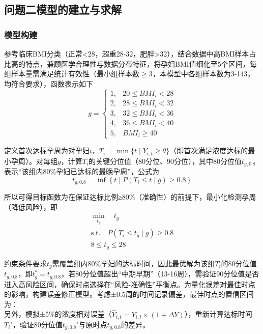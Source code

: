 \documentclass[withoutpreface,bwprint]{cumcmthesis} %
\begin{document}

\subsection{问题二模型的建立与求解}

\subsubsection{模型构建} 
参考临床BMI分类（正常<28，超重28-32，肥胖>32），结合数据中高BMI样本占比高的特点，兼顾医学合理性与数据分布特征，将孕妇BMI值细化至5个区间，每组样本量需满足统计有效性（最小组样本数$\ge$3，本模型中各组样本数为3-143，均符合要求），函数表示如下
\begin{equation}
    g = \begin{cases} 
1, & 20 \leq BMI_i < 28 \\
2, & 28 \leq BMI_i < 32 \\
3, & 32 \leq BMI_i < 36 \\
4, & 36 \leq BMI_i < 40 \\
5, & BMI_i \geq 40 
\end{cases}
\end{equation}

定义首次达标孕周为对孕妇$i$，$T_i = \min\{t \mid Y_{i,t}≥\theta\}$（即首次满足浓度达标的最小孕周）。对每组$g$，计算$T_i$的关键分位值（80分位、90分位），其中80分位值$t_{g,0.8}$表示“该组内80\%孕妇已达标的最晚孕周”，公式为
\begin{equation}
    t_{g,0.8} = \inf\left\{ t \mid P(T_i \leq t \mid g) \geq 0.8 \right\}
\end{equation}

所以可得目标函数为在保证达标比例≥80\%（准确性）的前提下，最小化检测孕周（降低风险），即  
\begin{align}
\min_{t_g} \quad t_g \\
\text{s.t.} \quad P(T_i \leq t_g \mid g) \geq 0.8 \\
8 \leq t_g \leq 28
\end{align}


约束条件要求$t_g$需覆盖组内80\%孕妇的达标时间，因此最优解为该组$T_i$的80分位值$t_{g,0.8}$，即$t_g^* = t_{g,0.8}$，若80分位值超出“中期早期”（13-16周），需验证90分位值是否进入高风险区间，确保时点选择在“风险-准确性”平衡点。为量化误差对最佳时点的影响，构建误差修正模型。考虑±0.5周的时间记录偏差，最佳时点的置信区间为：  
\begin{equation}
[t_g^* - \Delta t, t_g^* + \Delta t]
\end{equation}
另外，模拟±5\%的浓度相对误差（$\hat{Y}_{i,t} = Y_{i,t} \times (1+\Delta Y)$），重新计算达标时间$T_i'$，验证80分位值$t_{g,0.8}'$与原时点$t_{g,0.8}$的差异。  
\end{document}
